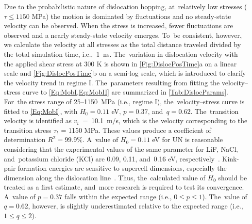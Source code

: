 \documentclass[applsci,article,accept,pdftex,moreauthors]{Definitions/mdpi}
\newcommand{\?}{\stackrel{?}{=}}
\begin{document}
Due to the probabilistic nature of dislocation hopping, at~relatively low stresses ($\tau \leq 1150$ MPa) the motion is dominated by fluctuations and no steady-state velocity can be observed. When the stress is increased, fewer fluctuations are observed and a nearly steady-state velocity emerges. To~be consistent, however, we calculate the velocity at all stresses as the total distance traveled divided by the total simulation time, \mbox{i.e.,~1 ns.} The~variation in dislocation velocity with the applied shear stress at 300 K is shown in \cref{Fig:DislocPosTime}a on a linear scale and \cref{Fig:DislocPosTime}b on a semi-log scale, which is introduced to clarify the velocity trend in regime I. The~parameters resulting from fitting the velocity--stress curve to \mbox{\cref{Eq:MobI,Eq:MobII}} are summarized in \cref{Tab:DislocParams}. For~the stress range of \mbox{25--1150 MPa} (i.e., regime I), the~velocity--stress curve is fitted to \cref{Eq:MobI}, with $H_0 = 0.11$ eV, $p=0.37$, and~$q=0.62$. The~transition velocity is identified as \mbox{$v_t$ = 10.1 m/s,} which is the velocity corresponding to the transition stress $\tau_t$ = 1150 MPa. These values produce a coefficient of determination $R^2 = 99.9\%$. A~value of $H_0 = 0.11$ eV for UN is reasonable considering that the experimental values of the same parameter for LiF, NaCl, and~potassium chloride (KCl) are 0.09, 0.11, and~0.16 eV, respectively~\cite{Haasen1985}. Kink-pair formation energies are sensitive to supercell dimensions, especially the dimension along the dislocation line~\cite{Ventelon2009}. Thus, the~calculated value of $H_0$ should be treated as a first estimate, and~more research is required to test its convergence. A~value of $p = 0.37$ falls within the expected range (i.e., $0 \leq p \leq 1$). The~value of $q = 0.62$, however, is slightly underestimated relative to the expected range (i.e., $1 \leq q \leq 2$).
\end{document}
